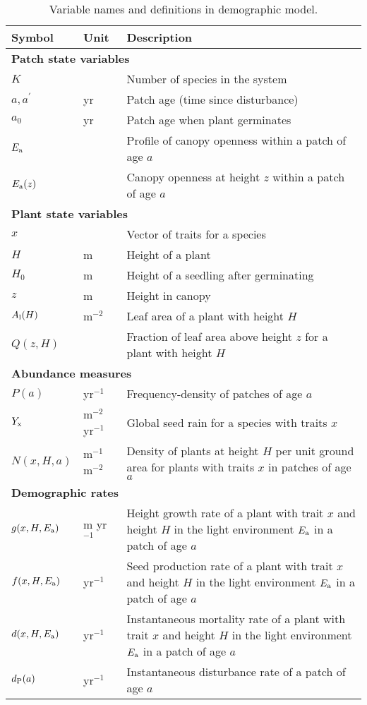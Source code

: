 \documentclass[10pt,twoside]{article}
\begin{document}
\begin{table}[ht]
 \caption{Variable names and definitions in demographic model.}
\centering
  \begin{tabular}{p{2cm}p{2cm}p{9cm}}
  \hline
  Symbol & Unit & Description \\
  \hline
  \multicolumn{3}{l}{\textbf{Patch state variables}} \\
  $K$   & & Number of species in the system \\
  $a, a^{\prime}$ & yr & Patch age (time since disturbance)\\
  $a_0$ & yr & Patch age when plant germinates \\
  $E_{\rm a}$ & & Profile of canopy openness within a patch of age $a$\\
  $E_{\rm a}(z)$&  & Canopy openness at height $z$ within a patch of age $a$\\

  \multicolumn{3}{l}{\textbf{Plant state variables}} \\
  $x$   & & Vector of traits for a species\\
  $H$   & m & Height of a plant\\
  $H_0$   & m  & Height of a seedling after germinating\\
  $z$   & m & Height in canopy\\
  $A_{\rm l}(H)$  & m$^{-2}$ & Leaf area of a plant with height $H$ \\
  $Q(z, H)$ &  & Fraction of leaf area above height $z$ for a plant with height $H$\\

  \multicolumn{3}{l}{\textbf{Abundance measures}} \\
  $P(a)$ & yr$^{-1}$ & Frequency-density of patches of age $a$ \\
  $Y_{\rm x}$ & m$^{-2}$ yr$^{-1}$ & Global seed rain for a species with traits $x$\\
  $N(x, H, a)$ & m$^{-1}$ m$^{-2}$ & Density of plants at height $H$ per unit ground area for plants with traits $x$ in patches of age $a$\\

  \multicolumn{3}{l}{\textbf{Demographic rates}} \\
  $g(x, H, E_{\rm a})$ & m yr$^{-1}$ & Height growth rate of a plant with trait $x$ and height $H$ in the light environment $E_{\rm a}$ in a patch of age $a$\\
  $f(x, H, E_{\rm a})$ & yr$^{-1}$ & Seed production rate of a plant with trait $x$ and height $H$ in the light environment $E_{\rm a}$ in a patch of age $a$\\
  $d(x, H, E_{\rm a})$ & yr$^{-1}$ & Instantaneous mortality rate of a plant with trait $x$ and height $H$ in the light environment $E_{\rm a}$ in a patch of age $a$\\
  $d_{\rm P}(a)$ & yr$^{-1}$ & Instantaneous disturbance rate of a patch of age $a$\\


\end{tabular}
\end{table}
\end{document}
